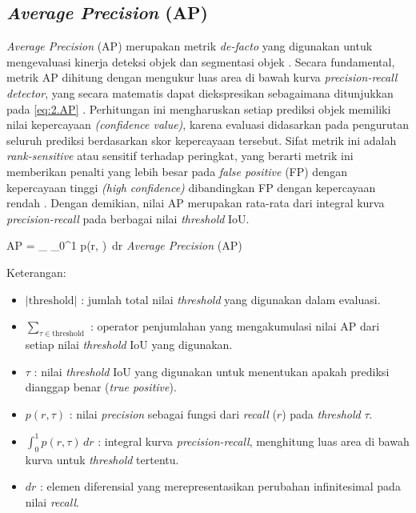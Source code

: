 \subsection{\textit{Average Precision} (AP)} \label{II.TeoriAP}
\textit{Average Precision} (AP) merupakan metrik \textit{de-facto} yang digunakan untuk mengevaluasi kinerja deteksi objek dan segmentasi objek \cite{APmAP}. Secara fundamental, metrik AP dihitung dengan mengukur luas area di bawah kurva \textit{precision-recall detector}, yang secara matematis dapat diekspresikan sebagaimana ditunjukkan pada \ref{eq:2.AP} \cite{ap}. Perhitungan ini mengharuskan setiap prediksi objek memiliki nilai kepercayaan \textit{(confidence value)}, karena evaluasi didasarkan pada pengurutan seluruh prediksi berdasarkan skor kepercayaan tersebut. Sifat metrik ini adalah \textit{rank-sensitive} atau sensitif terhadap peringkat, yang berarti metrik ini memberikan penalti yang lebih besar pada \textit{false positive} (FP) dengan kepercayaan tinggi \textit{(high confidence)} dibandingkan FP dengan kepercayaan rendah \cite{APmAP}. Dengan demikian, nilai AP merupakan rata-rata dari integral kurva \textit{precision-recall} pada berbagai nilai \textit{threshold} IoU. \par

\vspace{0.5\baselineskip}
\begin{equationcaptioned}[eq:2.AP]{
	AP =  \sum_{\tau \in {}} \int_0^1 p(r, \tau)\, dr
}{
	\textit{Average Precision} (AP)
}
\end{equationcaptioned}

Keterangan: 
\begin{itemize}
\renewcommand\labelitemi{} %
	\item $|\text{threshold}|$ : jumlah total nilai \textit{threshold} yang digunakan dalam evaluasi.
	\item $\sum_{\tau \in \text{threshold}}$ : operator penjumlahan yang mengakumulasi nilai AP dari setiap nilai \textit{threshold} IoU yang digunakan.
	\item $\tau$ : nilai \textit{threshold} IoU yang digunakan untuk menentukan apakah prediksi dianggap benar (\textit{true positive}).
	\item $p(r, \tau)$ : nilai \textit{precision} sebagai fungsi dari \textit{recall} ($r$) pada \textit{threshold} $\tau$.
	\item $\int_0^1 p(r, \tau)\, dr$ : integral kurva \textit{precision-recall}, menghitung luas area di bawah kurva untuk \textit{threshold} tertentu.
	\item $dr$ : elemen diferensial yang merepresentasikan perubahan infinitesimal pada nilai \textit{recall}.
\end{itemize}

